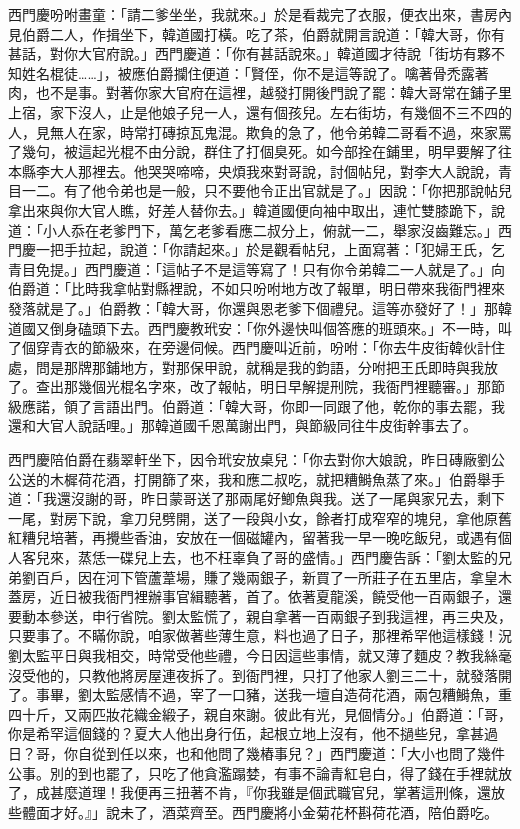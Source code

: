 西門慶吩咐畫童：「請二爹坐坐，我就來。」於是看裁完了衣服，便衣出來，書房內見伯爵二人，作揖坐下，韓道國打橫。吃了茶，伯爵就開言說道：「韓大哥，你有甚話，對你大官府說。」西門慶道：「你有甚話說來。」韓道國才待說「街坊有夥不知姓名棍徒……」，被應伯爵攔住便道：「賢侄，你不是這等說了。噙著骨禿露著肉，也不是事。對著你家大官府在這裡，越發打開後門說了罷：韓大哥常在鋪子里上宿，家下沒人，止是他娘子兒一人，還有個孩兒。左右街坊，有幾個不三不四的人，見無人在家，時常打磚掠瓦鬼混。欺負的急了，他令弟韓二哥看不過，來家罵了幾句，被這起光棍不由分說，群住了打個臭死。如今部拴在鋪里，明早要解了往本縣李大人那裡去。他哭哭啼啼，央煩我來對哥說，討個帖兒，對李大人說說，青目一二。有了他令弟也是一般，只不要他令正出官就是了。」因說：「你把那說帖兒拿出來與你大官人瞧，好差人替你去。」韓道國便向袖中取出，連忙雙膝跪下，說道：「小人忝在老爹門下，萬乞老爹看應二叔分上，俯就一二，舉家沒齒難忘。」西門慶一把手拉起，說道：「你請起來。」於是觀看帖兒，上面寫著：「犯婦王氏，乞青目免提。」西門慶道：「這帖子不是這等寫了！只有你令弟韓二一人就是了。」向伯爵道：「比時我拿帖對縣裡說，不如只吩咐地方改了報單，明日帶來我衙門裡來發落就是了。」伯爵教：「韓大哥，你還與恩老爹下個禮兒。這等亦發好了！」那韓道國又倒身磕頭下去。西門慶教玳安：「你外邊快叫個答應的班頭來。」不一時，叫了個穿青衣的節級來，在旁邊伺候。西門慶叫近前，吩咐：「你去牛皮街韓伙計住處，問是那牌那鋪地方，對那保甲說，就稱是我的鈞語，分咐把王氏即時與我放了。查出那幾個光棍名字來，改了報帖，明日早解提刑院，我衙門裡聽審。」那節級應諾，領了言語出門。伯爵道：「韓大哥，你即一同跟了他，乾你的事去罷，我還和大官人說話哩。」那韓道國千恩萬謝出門，與節級同往牛皮街幹事去了。

西門慶陪伯爵在翡翠軒坐下，因令玳安放桌兒：「你去對你大娘說，昨日磚廠劉公公送的木樨荷花酒，打開篩了來，我和應二叔吃，就把糟鰣魚蒸了來。」伯爵舉手道：「我還沒謝的哥，昨日蒙哥送了那兩尾好鯽魚與我。送了一尾與家兄去，剩下一尾，對房下說，拿刀兒劈開，送了一段與小女，餘者打成窄窄的塊兒，拿他原舊紅糟兒培著，再攪些香油，安放在一個磁罐內，留著我一早一晚吃飯兒，或遇有個人客兒來，蒸恁一碟兒上去，也不枉辜負了哥的盛情。」西門慶告訴：「劉太監的兄弟劉百戶，因在河下管蘆葦場，賺了幾兩銀子，新買了一所莊子在五里店，拿皇木蓋房，近日被我衙門裡辦事官緝聽著，首了。依著夏龍溪，饒受他一百兩銀子，還要動本參送，申行省院。劉太監慌了，親自拿著一百兩銀子到我這裡，再三央及，只要事了。不瞞你說，咱家做著些薄生意，料也過了日子，那裡希罕他這樣錢！況劉太監平日與我相交，時常受他些禮，今日因這些事情，就又薄了麵皮？教我絲毫沒受他的，只教他將房屋連夜拆了。到衙門裡，只打了他家人劉三二十，就發落開了。事畢，劉太監感情不過，宰了一口豬，送我一壇自造荷花酒，兩包糟鰣魚，重四十斤，又兩匹妝花織金緞子，親自來謝。彼此有光，見個情分。」伯爵道：「哥，你是希罕這個錢的？夏大人他出身行伍，起根立地上沒有，他不撾些兒，拿甚過日？哥，你自從到任以來，也和他問了幾樁事兒？」西門慶道：「大小也問了幾件公事。別的到也罷了，只吃了他貪濫蹋婪，有事不論青紅皂白，得了錢在手裡就放了，成甚麼道理！我便再三扭著不肯，『你我雖是個武職官兒，掌著這刑條，還放些體面才好。』」說未了，酒菜齊至。西門慶將小金菊花杯斟荷花酒，陪伯爵吃。


